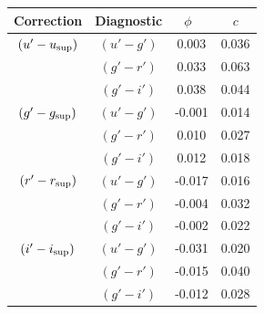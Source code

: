 \noindent\begin{minipage}{\linewidth}
    \centering
    
    \label{table:all ULTRACAM colour corrections}
    \begin{tabular}{cccc}
        Correction & Diagnostic &   $\phi$\   & $c$ \\
        \hline
        \hline
        $(u'-u_{\rm sup})$ &  $(u'-g')$   & 0.003 & 0.036 \\
                    &  $(g'-r')$   & 0.033 & 0.063 \\
                    &  $(g'-i')$   & 0.038 & 0.044 \\
        \hline
        $(g'-g_{\rm sup})$ &  $(u'-g')$   & -0.001 & 0.014 \\
                    &  $(g'-r')$   & 0.010  & 0.027 \\
                    &  $(g'-i')$   & 0.012  & 0.018 \\
        \hline
        $(r'-r_{\rm sup})$ &  $(u'-g')$   & -0.017 & 0.016 \\
                    &  $(g'-r')$   & -0.004 & 0.032 \\
                    &  $(g'-i')$   & -0.002 & 0.022 \\
        \hline
        $(i'-i_{\rm sup})$ &  $(u'-g')$   & -0.031 & 0.020 \\
                    &  $(g'-r')$   & -0.015 & 0.040 \\
                    &  $(g'-i')$   & -0.012 & 0.028 \\
        \hline
        \hline
    \end{tabular}


\end{minipage}
